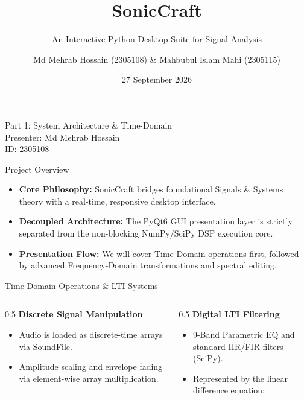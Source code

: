 \documentclass[11pt, aspectratio=169]{beamer}
\title{SonicCraft}
\subtitle{An Interactive Python Desktop Suite for Signal Analysis}
\author{Md Mehrab Hossain (2305108) \& Mahbubul Islam Mahi (2305115)}
\date{27 September 2026}
\begin{document}
\begin{frame}[plain]
  \titlepage
\end{frame}

\begin{frame}[standout]
  Part 1: System Architecture \& Time-Domain \\
  \vspace{0.5em}
  \large Presenter: Md Mehrab Hossain \\
  \normalsize ID: 2305108
\end{frame}

\begin{frame}{Project Overview}
  \begin{itemize}[<+->]
    \item \textbf{Core Philosophy:} SonicCraft bridges foundational Signals \& Systems theory with a real-time, responsive desktop interface.
    \item \textbf{Decoupled Architecture:} The PyQt6 GUI presentation layer is strictly separated from the non-blocking NumPy/SciPy DSP execution core.
    \item \textbf{Presentation Flow:} We will cover Time-Domain operations first, followed by advanced Frequency-Domain transformations and spectral editing.
  \end{itemize}
\end{frame}

\begin{frame}{Time-Domain Operations \& LTI Systems}
  \begin{columns}[T]
    \begin{column}{0.5\textwidth}
      \textbf{Discrete Signal Manipulation}
      \begin{itemize}[<+->]
        \item Audio is loaded as discrete-time arrays via SoundFile.
        \item Amplitude scaling and envelope fading via element-wise array multiplication.
      \end{itemize}
    \end{column}
    
    \begin{column}{0.5\textwidth}
      \textbf{Digital LTI Filtering}
      \begin{itemize}[<+->]
        \item 9-Band Parametric EQ and standard IIR/FIR filters (SciPy).
        \item Represented by the linear difference equation:
      \end{itemize}
      \vspace{0.5em}
    \end{column}
  \end{columns}
\end{frame}
\end{document}
